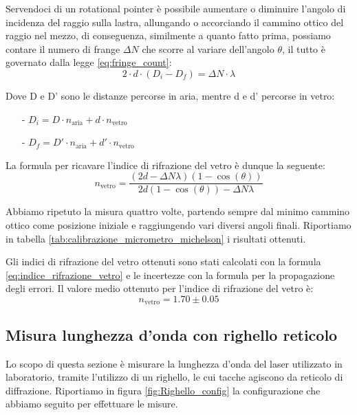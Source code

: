 \documentclass[letterpaper,12pt]{article}
\begin{document}
 Servendoci di un rotational pointer è possibile
aumentare o diminuire l'angolo di incidenza del raggio sulla lastra, allungando o accorciando il cammino ottico 
del raggio nel mezzo, di conseguenza, similmente a quanto fatto prima, possiamo contare il numero di frange $\Delta N$ che scorre 
al variare dell'angolo $\theta$, il tutto è governato dalla legge \eqref{eq:fringe_count}:
\begin{equation}
2 \cdot d \cdot (D_i - D_f) = \Delta N \cdot \lambda
\label{eq:fringe_count}
\end{equation}

Dove D e D' sono le distanze percorse in aria, mentre d e d' percorse in vetro:
\begin{itemize}
    \item[-] $D_i = D \cdot n_\text{aria} + d \cdot n_\text{vetro}$
    \item[-] $D_f = D' \cdot n_\text{aria} + d' \cdot n_\text{vetro}$
\end{itemize} 

La formula per ricavare l'indice di rifrazione del vetro è dunque la seguente:
\begin{equation}
    n_\text{vetro} = \frac{(2d -\Delta N \lambda)(1-\cos(\theta))}{2d (1-\cos(\theta)) - \Delta N \lambda}
    \label{eq:indice_rifrazione_vetro}
\end{equation}

Abbiamo ripetuto la misura quattro volte, partendo sempre dal minimo cammino ottico come posizione iniziale
e raggiungendo vari diversi angoli finali. Riportiamo in tabella \ref{tab:calibrazione_micrometro_michelson} i risultati ottenuti.


Gli indici di rifrazione del vetro ottenuti sono stati calcolati con la formula \eqref{eq:indice_rifrazione_vetro} e le incertezze
con la formula per la propagazione degli errori. Il valore medio ottenuto per l'indice di rifrazione del vetro è:
$$ n_\text{vetro} = 1.70 \pm 0.05$$


\subsection{Misura lunghezza d'onda con righello reticolo}

Lo scopo di questa sezione è misurare la lunghezza d'onda del laser utilizzato in laboratorio, tramite l'utilizzo 
di un righello, le cui tacche agiscono da reticolo di diffrazione. Riportiamo in figura \ref{fig:Righello_config} la configurazione
che abbiamo seguito per effettuare le misure.
\end{document}
